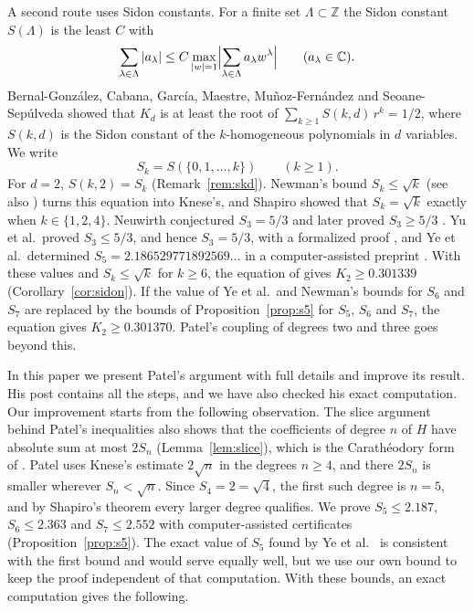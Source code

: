 \documentclass[11pt]{amsart}
\theoremstyle{remark}
\numberwithin{equation}{section}
\newcommand{\C}{\mathbb{C}}
\newcommand{\SidonRoot}{0.301339}
\newcommand{\YeVal}{2.186529771892569\ldots}
\newcommand{\FiveOwn}{2.187}
\newcommand{\SixOwn}{2.363}
\newcommand{\SevenOwn}{2.552}
\begin{document}
A second route uses Sidon constants. For a finite set $\Lambda\subset\mathbb Z$ the Sidon constant $S(\Lambda)$ is the least $C$ with
\[
\sum_{\lambda\in\Lambda}|a_\lambda|\le C\max_{|w|=1}\Bigl|\sum_{\lambda\in\Lambda}a_\lambda w^\lambda\Bigr|\qquad(a_\lambda\in\C).
\]
Bernal-Gonz\'alez, Cabana, Garc\'ia, Maestre, Mu\~noz-Fern\'andez and Seoane-Sep\'ulveda \cite[Theorem~3.3]{BCGMMS21} showed that $K_d$ is at least the root of $\sum_{k\ge1}S(k,d)\,r^k=1/2$, where $S(k,d)$ is the Sidon constant of the $k$-homogeneous polynomials in $d$ variables. We write
\[
S_k=S(\{0,1,\dots,k\})\qquad(k\ge1).
\]
For $d=2$, $S(k,2)=S_k$ (Remark~\ref{rem:skd}). Newman's bound $S_k\le\sqrt k$ \cite[Chapter~3]{Sha51} (see also \cite[(1)]{Neu26}) turns this equation into Knese's, and Shapiro \cite{Sha51} showed that $S_k=\sqrt k$ exactly when $k\in\{1,2,4\}$. Neuwirth conjectured $S_3=5/3$ \cite{Neu01} and later proved $S_3\ge5/3$ \cite{Neu26}. Yu et al.\ proved $S_3\le5/3$, and hence $S_3=5/3$, with a formalized proof \cite{Yu26}, and Ye et al.\ determined $S_5=\YeVal$ in a computer-assisted preprint \cite{Ye26}. With these values and $S_k\le\sqrt k$ for $k\ge6$, the equation of \cite{BCGMMS21} gives $K_2\ge\SidonRoot$ (Corollary~\ref{cor:sidon}). If the value of Ye et al.\ and Newman's bounds for $S_6$ and $S_7$ are replaced by the bounds of Proposition~\ref{prop:s5} for $S_5$, $S_6$ and $S_7$, the equation gives $K_2\ge0.301370$. Patel's coupling of degrees two and three goes beyond this.

In this paper we present Patel's argument with full details and improve its result. His post contains all the steps, and we have also checked his exact computation. Our improvement starts from the following observation. The slice argument behind Patel's inequalities also shows that the coefficients of degree $n$ of $H$ have absolute sum at most $2S_n$ (Lemma~\ref{lem:slice}), which is the Carath\'eodory form of \cite[Lemma~3.1]{BCGMMS21}. Patel uses Knese's estimate $2\sqrt n$ in the degrees $n\ge4$, and there $2S_n$ is smaller wherever $S_n<\sqrt n$. Since $S_4=2=\sqrt4$, the first such degree is $n=5$, and by Shapiro's theorem every larger degree qualifies. We prove $S_5\le\FiveOwn$, $S_6\le\SixOwn$ and $S_7\le\SevenOwn$ with computer-assisted certificates (Proposition~\ref{prop:s5}). The exact value of $S_5$ found by Ye et al.\ \cite{Ye26} is consistent with the first bound and would serve equally well, but we use our own bound to keep the proof independent of that computation. With these bounds, an exact computation gives the following.
\end{document}
